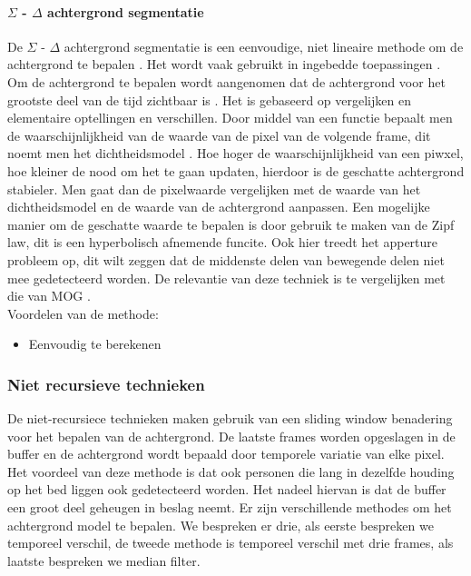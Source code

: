 \paragraph{ $\Sigma$ - $\Delta$ achtergrond segmentatie}
De $\Sigma$ - $\Delta$ achtergrond segmentatie is een eenvoudige, niet lineaire methode om de achtergrond te bepalen \cite{bibSDB}. Het wordt vaak gebruikt in ingebedde toepassingen \cite{bibBET8}. Om de achtergrond te bepalen wordt aangenomen dat de achtergrond voor het grootste deel van de tijd zichtbaar is \cite{bibSDB2}. Het is gebaseerd op vergelijken en elementaire optellingen en verschillen. 
Door middel van een functie bepaalt men de waarschijnlijkheid van de waarde van de pixel van de volgende frame, dit noemt men het dichtheidsmodel .  Hoe hoger de waarschijnlijkheid van een piwxel, hoe kleiner de nood om het te gaan updaten, hierdoor is de geschatte achtergrond stabieler. \cite{bibSDB2} Men gaat dan de pixelwaarde vergelijken met de waarde van het dichtheidsmodel en de waarde van de achtergrond aanpassen. Een mogelijke manier om de geschatte waarde te bepalen is door gebruik te maken van de Zipf law, dit is een hyperbolisch afnemende funcite. Ook hier treedt het apperture probleem op, dit wilt zeggen dat de middenste delen van bewegende delen niet mee gedetecteerd worden. De relevantie van deze techniek is te vergelijken met die van MOG \cite{bibSDB}.\\
Voordelen van de methode:
\begin{itemize}
	\item Eenvoudig te berekenen
\end{itemize}

\subsubsection{Niet recursieve technieken}
\label{refNRT}
De niet-recursiece technieken maken gebruik van een sliding window benadering voor het bepalen van de achtergrond. De laatste frames worden opgeslagen in de buffer en de achtergrond wordt bepaald door temporele variatie van elke pixel. Het voordeel van deze methode is dat ook personen die lang in dezelfde houding op het bed liggen ook gedetecteerd worden. Het nadeel hiervan is dat de buffer een groot deel geheugen in beslag neemt. Er zijn verschillende methodes om het achtergrond model te bepalen. We bespreken er drie, als eerste bespreken we temporeel verschil, de tweede methode is temporeel verschil met drie frames, als laatste bespreken we median filter.

